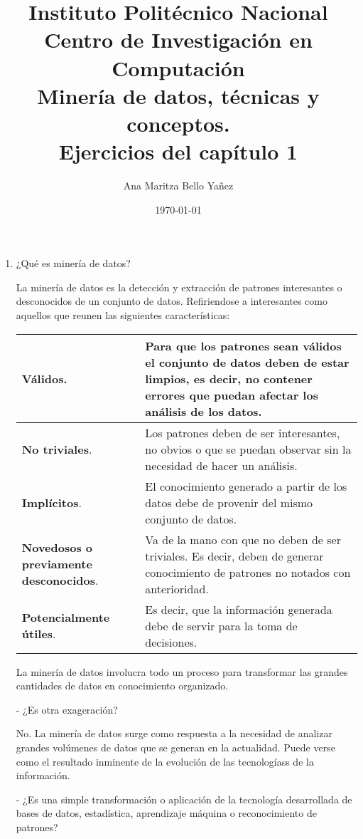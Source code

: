 \documentclass{article}
\title{Instituto Politécnico Nacional \\ Centro de Investigación en Computación
\\
\vspace{1cm}
    Minería de datos, técnicas y conceptos. \\ Ejercicios del capítulo 1 }
\author{
    Ana Maritza Bello Yañez
}
\date{\today}
\begin{document}
\maketitle

\begin{enumerate}
\item ¿Qué es minería de datos?

\textcolor{NavyBlue}{
La minería de datos es la detección y extracción de patrones interesantes o
desconocidos de un conjunto de datos. Refiriendose a interesantes como aquellos
que reunen las siguientes características:}

\vfill
\begin{tabular}{|p{2.8cm}|p{7.5cm}|}
\hline
\textcolor{NavyBlue}{ \textbf{Válidos}.} & Para que los patrones sean válidos el conjunto de datos deben de
estar limpios, es decir, no contener errores que puedan afectar los análisis de
los datos.\\
\hline
\textcolor{NavyBlue}{ \textbf{No triviales}.} & Los patrones deben de ser interesantes, no obvios o que se
puedan observar sin la necesidad de hacer un análisis.\\
\hline
\textcolor{NavyBlue}{ \textbf{Implícitos}.} & El conocimiento generado a partir de los datos debe de
provenir del mismo conjunto de datos.\\
\hline
\textcolor{NavyBlue}{ \textbf{Novedosos o previamente desconocidos}. } & Va de la mano con que no deben de
ser triviales. Es decir, deben de generar conocimiento de patrones no notados
con anterioridad.\\
\hline
\textcolor{NavyBlue}{\textbf{Potencialmente útiles}.} & Es decir, que la información generada debe de
servir para la toma de decisiones. \\
\hline
\end{tabular}
\vfill


\textcolor{NavyBlue}{La minería de datos involucra todo un proceso para transformar las grandes
cantidades de datos en conocimiento organizado.}


- ¿Es otra exageración?

\textcolor{NavyBlue}{No. La minería de datos surge como respuesta a la necesidad
de analizar grandes volúmenes de datos que se generan en la actualidad. Puede
verse como el resultado inminente de la evolución de las tecnologíass de la
información.}

- ¿Es una simple transformación o aplicación de la tecnología desarrollada de
bases de datos, estadística, aprendizaje máquina o reconocimiento de patrones?


\end{enumerate}
\end{document}
